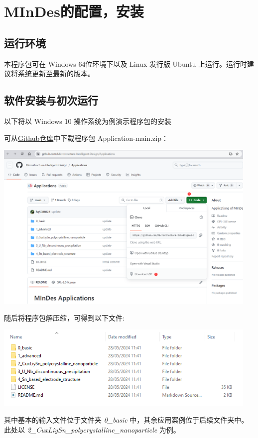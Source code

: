 \chapter{MInDes的配置，安装}\label{chap:install}

\section{运行环境}

本程序包可在 Windows 64位环境下以及 Linux 发行版 Ubuntu 上运行。运行时建议将系统更新至最新的版本。

\section{软件安装与初次运行}

以下将以 Windows 10 操作系统为例演示程序包的安装

可从\href{https://github.com/Microstructure-Intelligent-Design/Applications}{Github仓库}中下载程序包
Application-main.zip：

\includegraphics[width=5in]{rsc/download_mides.png}

随后将程序包解压缩，可得到以下文件:

\includegraphics[width=5in]{rsc/mid_package_contents.png}

其中基本的输入文件位于文件夹 \emph{0\_basic} 中，其余应用案例位于后续文件夹中。
此处以 \emph{2\_CuxLiySn\_polycrystalline\_nanoparticle} 为例。

